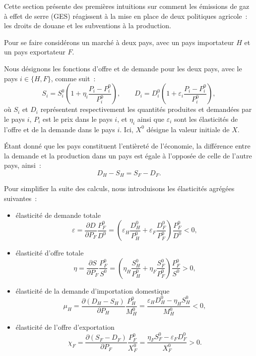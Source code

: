 Cette section présente des premières intuitions sur comment les émissions de gaz à effet de serre (GES) réagissent à la mise en place de deux politiques agricole~: les droits de douane et les subventions à la production.

Pour se faire considérons un marché à deux pays, avec un pays importateur $H$ et un pays exportateur $F$.

Nous désignons les fonctions d'offre et de demande pour les deux pays, avec le pays $i \in \{H, F\}$, comme suit~:
\begin{equation}
    S_i = S_i^0\left(1 + \eta_i\frac{P_i - P_i^0}{P_i^0}\right), \qquad
    D_i = D_i^0\left(1 + \varepsilon_i\frac{P_i - P_i^0}{P_i^0}\right),
\end{equation}
où $S_i$ et $D_i$ représentent respectivement les quantités produites et demandées par le pays $i$, $P_i$ est le prix dans le pays $i$, et $\eta_i$ ainsi que $\varepsilon_i$ sont les élasticités de l'offre et de la demande dans le pays $i$. Ici, $X^0$ désigne la valeur initiale de $X$.

Étant donné que les pays constituent l'entièreté de l'économie, la différence entre la demande et la production dans un pays est égale à l'opposée de celle de l'autre pays, ainsi~:
\begin{equation}
    D_H - S_H = S_F - D_F.
\end{equation}

Pour simplifier la suite des calculs, nous introduisons les élasticités agrégées suivantes~:
\begin{itemize}
    \item élasticité de demande totale
          \begin{equation}
              \varepsilon = \frac{\partial D}{\partial P_F} \frac{P_F^0}{D^0} = \left( \varepsilon_H \frac{D_H^0}{P_H^0} + \varepsilon_F \frac{D_F^0}{P_F^0} \right)\frac{P_F^0}{D^0} < 0,
          \end{equation}
    \item élasticité d'offre totale
          \begin{equation}
              \eta = \frac{\partial S}{\partial P_F} \frac{P_F^0}{S^0} = \left( \eta_H \frac{S_H^0}{P_H^0} + \eta_F \frac{S_F^0}{P_F^0} \right)\frac{P_F^0}{S^0} > 0,
          \end{equation}
    \item élasticité de la demande d'importation domestique
          \begin{equation}
              \mu_H = \frac{\partial (D_H - S_H)}{\partial P_H} \frac{P_H^0}{M_H^0} = \frac{\varepsilon_H D_H^0 - \eta_H S_H^0}{M_H^0} < 0,
          \end{equation}
    \item élasticité de l'offre d'exportation
          \begin{equation}
              \chi_F = \frac{\partial (S_F - D_F)}{\partial P_F} \frac{P_F^0}{X_F^0} = \frac{\eta_F S_F^0 - \varepsilon_F D_F^0}{X_F^0} > 0.
          \end{equation}
\end{itemize}

